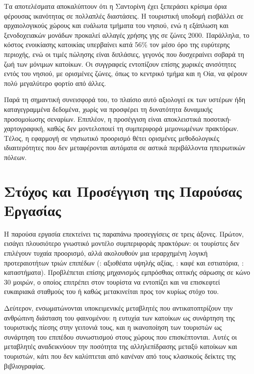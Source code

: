 Τα αποτελέσματα αποκαλύπτουν ότι η Σαντορίνη έχει ξεπεράσει κρίσιμα όρια
φέρουσας ικανότητας σε πολλαπλές διαστάσεις. Η τουριστική υποδομή εισβάλλει
σε αρχαιολογικούς χώρους και ευάλωτα τμήματα του νησιού, ενώ η εξάπλωση
 και ξενοδοχειακών μονάδων προκαλεί αλλαγές χρήσης γης σε ζώνες
 2000. Παράλληλα, το κόστος ενοικίασης κατοικίας υπερβαίνει κατά
56\% τον μέσο όρο της ευρύτερης περιοχής, ενώ οι τιμές πώλησης είναι
διπλάσιες, γεγονός που δυσχεραίνει σοβαρά τη ζωή των μόνιμων κατοίκων.
Οι συγγραφείς εντοπίζουν επίσης χωρικές ανισότητες εντός του νησιού, με
ορισμένες ζώνες, όπως το κεντρικό τμήμα και η Οία, να φέρουν πολύ μεγαλύτερο
φορτίο από άλλες.

Παρά τη σημαντική συνεισφορά του, το πλαίσιο αυτό αξιολογεί εκ των υστέρων
ήδη καταγεγραμμένα δεδομένα, χωρίς να προσφέρει τη δυνατότητα δυναμικής
προσομοίωσης σεναρίων. Επιπλέον, η προσέγγιση είναι αποκλειστικά
ποσοτική-χαρτογραφική, καθώς δεν μοντελοποιεί τη συμπεριφορά μεμονωμένων
πρακτόρων. Τέλος, η εφαρμογή σε νησιωτικό προορισμό θέτει ορισμένες
μεθοδολογικές ιδιαιτερότητες που δεν μεταφέρονται αυτόματα σε αστικά
περιβάλλοντα ηπειρωτικών πόλεων.


\section{Στόχος και Προσέγγιση της Παρούσας Εργασίας}

Η παρούσα εργασία επεκτείνει τις παραπάνω προσεγγίσεις σε τρεις άξονες.
Πρώτον, εισάγει πλουσιότερο γνωστικό μοντέλο συμπεριφοράς πρακτόρων:
οι τουρίστες δεν επιλέγουν τυχαία προορισμό, αλλά ακολουθούν μια
ιεραρχημένη λογική προτεραιοτήτων τριών επιπέδων (:
αξιοθέατα υψηλής αξίας, : καφέ και εστιατόρια, :
καταστήματα). Προβλέπεται επίσης μηχανισμός εμπρόσθιας οπτικής σάρωσης
 σε κώνο 30 μοιρών, ο οποίος επιτρέπει στον
τουρίστα να εντοπίζει και να επισκεφτεί ευκαιριακά σταθμούς του
 ή  καθώς μετακινείται προς τον κυρίως στόχο του.

Δεύτερον, ενσωματώνονται υποκειμενικές μεταβλητές που αντικατοπτρίζουν
την ανθρώπινη διάσταση του φαινομένου: η ευτυχία των κατοίκων
 ως συνάρτηση της τουριστικής πίεσης στην γειτονιά
τους, και η ικανοποίηση των τουριστών  ως συνάρτηση
του επιπέδου συνωστισμού στους χώρους που επισκέπτονται. Αυτές οι
μεταβλητές αναδεικνύουν την ποσότητα της αλληλεπίδρασης μεταξύ
κατοίκων και τουριστών, κάτι που δεν καλύπτεται από κανέναν από τους
κλασικούς δείκτες της βιβλιογραφίας.

